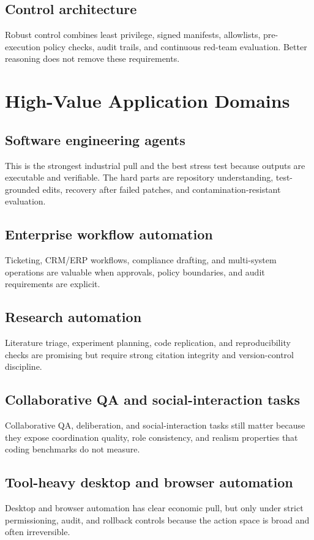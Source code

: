 \documentclass[11pt]{article}
\begin{document}
\subsection{Control architecture}
Robust control combines least privilege, signed manifests, allowlists, pre-execution policy checks, audit trails, and continuous red-team evaluation. Better reasoning does not remove these requirements.

\section{High-Value Application Domains}
\subsection{Software engineering agents}
This is the strongest industrial pull and the best stress test because outputs are executable and verifiable. The hard parts are repository understanding, test-grounded edits, recovery after failed patches, and contamination-resistant evaluation.

\subsection{Enterprise workflow automation}
Ticketing, CRM/ERP workflows, compliance drafting, and multi-system operations are valuable when approvals, policy boundaries, and audit requirements are explicit.

\subsection{Research automation}
Literature triage, experiment planning, code replication, and reproducibility checks are promising but require strong citation integrity and version-control discipline.

\subsection{Collaborative QA and social-interaction tasks}
Collaborative QA, deliberation, and social-interaction tasks still matter because they expose coordination quality, role consistency, and realism properties that coding benchmarks do not measure.

\subsection{Tool-heavy desktop and browser automation}
Desktop and browser automation has clear economic pull, but only under strict permissioning, audit, and rollback controls because the action space is broad and often irreversible.
\end{document}
